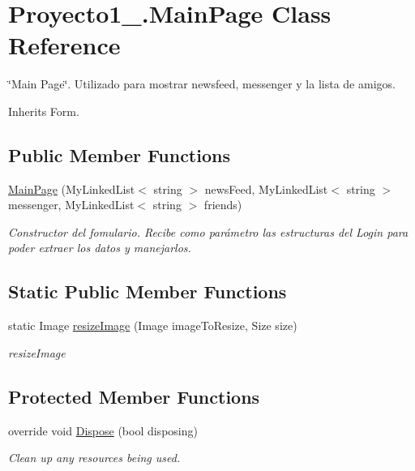 \hypertarget{class_proyecto1__1096917_1_1_main_page}{}\section{Proyecto1\+\_.\+Main\+Page Class Reference}
\label{class_proyecto1__1096917_1_1_main_page}


\char`\"{}\+Main Page\char`\"{}. Utilizado para mostrar newsfeed, messenger y la lista de amigos.  




Inherits Form.

\subsection*{Public Member Functions}
\begin{DoxyCompactItemize}
\item 
\mbox{\hyperlink{class_proyecto1__1096917_1_1_main_page_a09fc46aaf6cb59984d39161b164a4dc7}{Main\+Page}} (My\+Linked\+List$<$ string $>$ news\+Feed, My\+Linked\+List$<$ string $>$ messenger, My\+Linked\+List$<$ string $>$ friends)
\begin{DoxyCompactList}\small\item\em Constructor del fomulario. Recibe como parámetro las estructuras del Login para poder extraer los datos y manejarlos. \end{DoxyCompactList}\end{DoxyCompactItemize}
\subsection*{Static Public Member Functions}
\begin{DoxyCompactItemize}
\item 
static Image \mbox{\hyperlink{class_proyecto1__1096917_1_1_main_page_ac6f45a16f97ec2509701d3fafe7e4dda}{resize\+Image}} (Image image\+To\+Resize, Size size)
\begin{DoxyCompactList}\small\item\em resize\+Image \end{DoxyCompactList}\end{DoxyCompactItemize}
\subsection*{Protected Member Functions}
\begin{DoxyCompactItemize}
\item 
override void \mbox{\hyperlink{class_proyecto1__1096917_1_1_main_page_a6dcba2644a4939b0dde2c227e96710b0}{Dispose}} (bool disposing)
\begin{DoxyCompactList}\small\item\em Clean up any resources being used. \end{DoxyCompactList}\end{DoxyCompactItemize}


